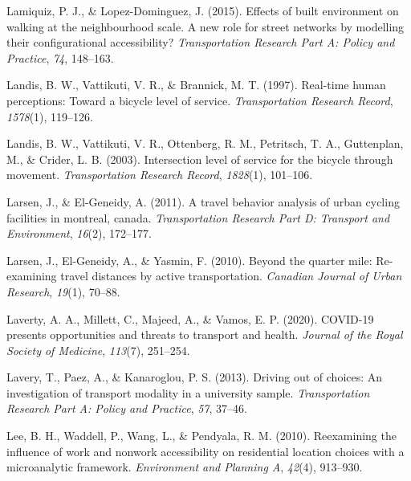 \documentclass[
11pt, %
oneside, %
english, %
singlespacing, %
]{macthesis} %
\newlength{\cslhangindent}
\newenvironment{CSLReferences}[2] %
 {%
  \setlength{\parindent}{0pt}
  \ifodd #1 \everypar{\setlength{\hangindent}{\cslhangindent}}\ignorespaces\fi
  \ifnum #2 > 0
  \setlength{\parskip}{#2\baselineskip}
  \fi
 }%
 {}
\begin{document}
\begin{CSLReferences}{1}{0}
\leavevmode{}%
Lamiquiz, P. J., \& Lopez-Dominguez, J. (2015). Effects of built environment on walking at the neighbourhood scale. A new role for street networks by modelling their configurational accessibility? \emph{Transportation Research Part A: Policy and Practice}, \emph{74}, 148--163.

\leavevmode{}%
Landis, B. W., Vattikuti, V. R., \& Brannick, M. T. (1997). Real-time human perceptions: Toward a bicycle level of service. \emph{Transportation Research Record}, \emph{1578}(1), 119--126.

\leavevmode{}%
Landis, B. W., Vattikuti, V. R., Ottenberg, R. M., Petritsch, T. A., Guttenplan, M., \& Crider, L. B. (2003). Intersection level of service for the bicycle through movement. \emph{Transportation Research Record}, \emph{1828}(1), 101--106.

\leavevmode{}%
Larsen, J., \& El-Geneidy, A. (2011). A travel behavior analysis of urban cycling facilities in montreal, canada. \emph{Transportation Research Part D: Transport and Environment}, \emph{16}(2), 172--177.

\leavevmode{}%
Larsen, J., El-Geneidy, A., \& Yasmin, F. (2010). Beyond the quarter mile: Re-examining travel distances by active transportation. \emph{Canadian Journal of Urban Research}, \emph{19}(1), 70--88.

\leavevmode{}%
Laverty, A. A., Millett, C., Majeed, A., \& Vamos, E. P. (2020). COVID-19 presents opportunities and threats to transport and health. \emph{Journal of the Royal Society of Medicine}, \emph{113}(7), 251--254.

\leavevmode{}%
Lavery, T., Paez, A., \& Kanaroglou, P. S. (2013). Driving out of choices: An investigation of transport modality in a university sample. \emph{Transportation Research Part A: Policy and Practice}, \emph{57}, 37--46.

\leavevmode{}%
Lee, B. H., Waddell, P., Wang, L., \& Pendyala, R. M. (2010). Reexamining the influence of work and nonwork accessibility on residential location choices with a microanalytic framework. \emph{Environment and Planning A}, \emph{42}(4), 913--930.


\end{CSLReferences}
\end{document}
